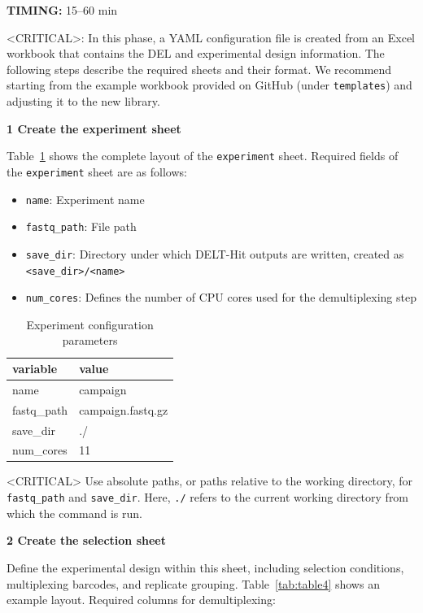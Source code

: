 \documentclass[pdflatex,sn-nature]{sn-jnl}
\newcommand{\protocolstep}[2]{\par\medskip\noindent\textbf{#1 \textbar{} #2}\par}
\begin{document}
\textbf{TIMING:} 15--60 min

<CRITICAL>: In this phase, a YAML configuration file is created from an Excel workbook that contains the DEL and experimental design information. The following steps describe the required sheets and their format. We recommend starting from the example workbook provided on GitHub (under \texttt{templates}) and adjusting it to the new library.


\protocolstep{1}{Create the experiment sheet}

Table~\ref{tab:table3} shows the complete layout of the \texttt{experiment} sheet. Required fields of the \texttt{experiment} sheet are as follows: 

\begin{itemize}
  \item \texttt{name}: Experiment name
  \item \texttt{fastq\_path}: File path
  \item \texttt{save\_dir}: Directory under which DELT-Hit outputs are written, created as \texttt{\textless save\_dir\textgreater/\textless name\textgreater}
  \item \texttt{num\_cores}: Defines the number of CPU cores used for the demultiplexing step
\end{itemize}

\begin{table}[htbp]
\centering
\caption{Experiment configuration parameters}
\label{tab:table3}
\begin{tabular}{ll}
\toprule
variable & value \\
\midrule
name & campaign \\
fastq\_path & campaign.fastq.gz \\
save\_dir & ./ \\
num\_cores & 11 \\
\bottomrule
\end{tabular}
\end{table}

<CRITICAL> Use absolute paths, or paths relative to the working directory, for \texttt{fastq\_path} and \texttt{save\_dir}. Here, \texttt{./} refers to the current working directory from which the command is run.


\protocolstep{2}{Create the selection sheet}

Define the experimental design within this sheet, including selection conditions, multiplexing barcodes, and replicate grouping. Table~\ref{tab:table4} shows an example layout. Required columns for demultiplexing:
\end{document}
